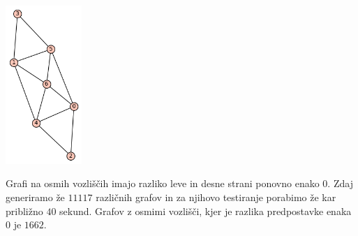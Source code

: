 \documentclass[10pt, a4paper]{article}
\begin{document}
\begin{center}
\includegraphics[height=6cm]{min_graf_7_5}
\end{center}

Grafi na osmih vozliščih imajo razliko leve in desne strani ponovno enako $0$. Zdaj generiramo že $11117$ različnih grafov in za njihovo testiranje porabimo že kar približno $40$ sekund. Grafov z osmimi vozlišči, kjer je razlika predpostavke enaka $0$ je $1662$.
\end{document}
